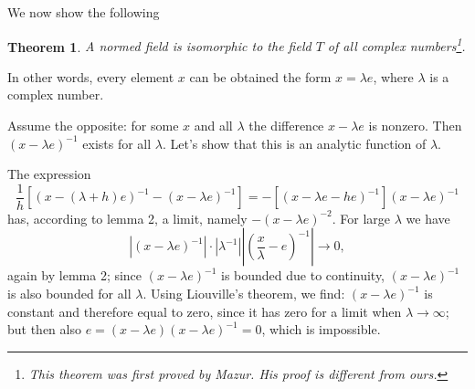 \documentclass{article}
\newtheorem{theorem}{Theorem}
\theoremstyle{definition}
\begin{document}
We now show the following
\begin{theorem}
  A normed field is isomorphic to the field $T$ of all complex numbers\footnote{This theorem was first proved by Mazur. His proof is different from ours.}.
\end{theorem}

In other words, every element $x$ can be obtained the form $x=\lambda e$, where $\lambda$ is a complex number.

Assume the opposite: for some $x$ and all $\lambda$ the difference $x-\lambda e$ is nonzero. Then $(x-\lambda e)^{-1}$ exists for all $\lambda$. Let's show that this is an analytic function of $\lambda$.

The expression
$$ \frac1h[(x-(\lambda+h)e)^{-1}-(x-\lambda e)^{-1}] = -[(x-\lambda e-he)^{-1}](x-\lambda e)^{-1} $$
has, according to lemma 2, a limit, namely $-(x-\lambda e)^{-2}$. For large $\lambda$ we have
$$ |(x-\lambda e)^{-1}|\cdot|\lambda^{-1}|\left|\left(\frac{x}\lambda-e\right)^{-1}\right| \to 0, $$
again by lemma 2; since $(x-\lambda e)^{-1}$ is bounded due to continuity, $(x-\lambda e)^{-1}$ is also bounded for all $\lambda$. Using Liouville's theorem, we find: $(x-\lambda e)^{-1}$ is constant and therefore equal to zero, since it has zero for a limit when $\lambda\to\infty$; but then also $e=(x-\lambda e)(x-\lambda e)^{-1}=0$, which is impossible.
\end{document}
